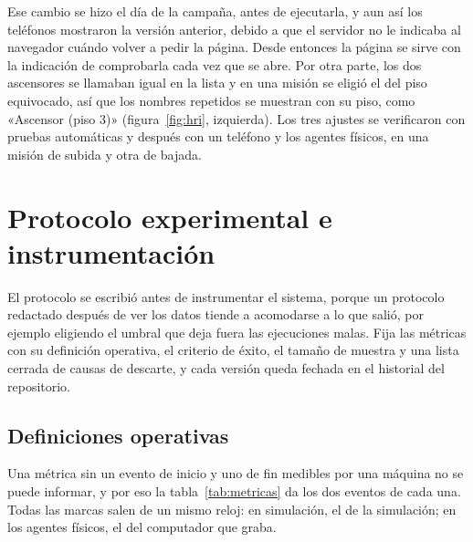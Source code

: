 Ese cambio se hizo el día de la campaña, antes de ejecutarla, y aun así los teléfonos mostraron la versión anterior, debido a que el servidor no le indicaba al navegador cuándo volver a pedir la página. Desde entonces la
página se sirve con la indicación de comprobarla cada vez que se abre. Por otra parte, los dos ascensores se llamaban igual en la lista y en una misión se eligió el del piso equivocado, así que los nombres repetidos se
muestran con su piso, como «Ascensor (piso 3)» (figura~\ref{fig:hri}, izquierda). Los tres ajustes se verificaron con pruebas automáticas y después con un teléfono y los agentes físicos, en una misión de subida y otra de
bajada.

\section{Protocolo experimental e instrumentación}
\label{sec:protocolo}

El protocolo se escribió antes de instrumentar el sistema, porque un protocolo redactado después de ver los datos tiende a acomodarse a lo que salió, por ejemplo eligiendo el umbral que deja fuera las ejecuciones malas. Fija
las métricas con su definición operativa, el criterio de éxito, el tamaño de muestra y una lista cerrada de causas de descarte, y cada versión queda fechada en el historial del repositorio.

\subsection{Definiciones operativas}

Una métrica sin un evento de inicio y uno de fin medibles por una máquina no se puede informar, y por eso la tabla~\ref{tab:metricas} da los dos eventos de cada una. Todas las marcas salen de un mismo reloj: en simulación, el de la
simulación; en los agentes físicos, el del computador que graba.

